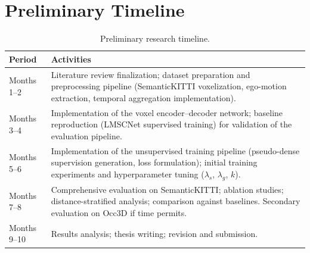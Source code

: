 \documentclass[a4paper, 12pt]{article}
\begin{document}
	\section{Preliminary Timeline}
	
	\begin{table}[H]
		\centering
		\begin{tabular}{|>{\centering\arraybackslash}m{3.5cm}|m{9cm}|}
			\hline
			\textbf{Period}           & \textbf{Activities}                                                                                                                          \\
			\hline
			Months 1--2               & Literature review finalization; dataset preparation and
			preprocessing pipeline (SemanticKITTI voxelization, ego-motion extraction,
			temporal aggregation implementation).                                                                                                                                        \\
			\hline
			Months 3--4               & Implementation of the voxel encoder--decoder network; baseline
			reproduction (LMSCNet supervised training) for validation of the evaluation
			pipeline.                                                                                                                                                                    \\
			\hline
			Months 5--6               & Implementation of the unsupervised training pipeline
			(pseudo-dense supervision generation, loss formulation); initial training
			experiments and hyperparameter tuning ($\lambda_s$, $\lambda_g$, $k$).                                                                                                      \\
			\hline
			Months 7--8               & Comprehensive evaluation on SemanticKITTI; ablation studies;
			distance-stratified analysis; comparison against baselines. Secondary
			evaluation on Occ3D if time permits.                                                                                                                                         \\
			\hline
			Months 9--10              & Results analysis; thesis writing; revision and submission.                                                                                    \\
			\hline
		\end{tabular}
		\caption{Preliminary research timeline.}
		\label{tab:timeline}
	\end{table}
	
	
	
	
\end{document}
